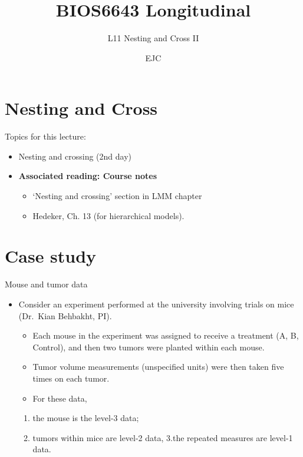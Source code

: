 \documentclass[
  9pt,
  ignorenonframetext,
]{beamer}
\title{BIOS6643 Longitudinal}
\subtitle{L11 Nesting and Cross II}
\author{EJC}
\date{}
\institute{Department of Biostatistics \& Informatics}
\providecommand{\tightlist}{%
  \setlength{\itemsep}{0pt}\setlength{\parskip}{0pt}}
\begin{document}
\frame{\titlepage}

\begin{frame}[allowframebreaks]
  \tableofcontents[hideallsubsections]
\end{frame}
\hypertarget{nesting-and-cross}{%
\section{Nesting and Cross}\label{nesting-and-cross}}

\begin{frame}{Topics for this lecture:}
\protect\hypertarget{topics-for-this-lecture}{}
\begin{itemize}
\tightlist
\item
  Nesting and crossing (2nd day)
\end{itemize}

\vspace{\baselineskip}

\begin{itemize}
\item
  \textbf{Associated reading: Course notes}

  \begin{itemize}
  \item
    `Nesting and crossing' section in LMM chapter
  \item
    Hedeker, Ch. 13 (for hierarchical models).
  \end{itemize}
\end{itemize}
\end{frame}

\hypertarget{case-study}{%
\section{Case study}\label{case-study}}

\begin{frame}{Mouse and tumor data}
\protect\hypertarget{mouse-and-tumor-data}{}
\begin{itemize}
\item
  Consider an experiment performed at the university involving trials on
  mice (Dr.~Kian Behbakht, PI).

  \begin{itemize}
  \item
    Each mouse in the experiment was assigned to receive a treatment (A,
    B, Control), and then two tumors were planted within each mouse.
  \item
    Tumor volume measurements (unspecified units) were then taken five
    times on each tumor.
  \item
    For these data,
  \end{itemize}

  \begin{enumerate}
  \tightlist
  \item
    the mouse is the level-3 data;
  \item
    tumors within mice are level-2 data, 3.the repeated measures are
    level-1 data.
  \end{enumerate}
\end{itemize}
\end{frame}
\end{document}
